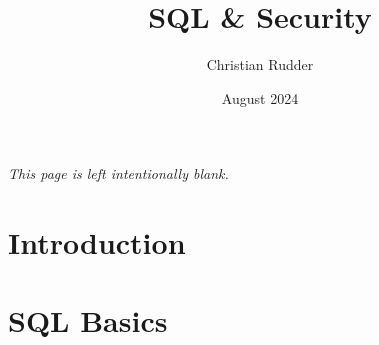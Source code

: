 \documentclass{article}
\title{SQL \& Security}
\author{Christian Rudder}
\date{August 2024}
\begin{document}
\maketitle

\tableofcontents

\newpage
\thispagestyle{empty}
\mbox{}
\vfill
\begin{center}
    \textit{This page is left intentionally blank.}
\end{center}
\vfill
\newpage

\section{Introduction}

\newpage

\section{SQL Basics}




\end{document}
